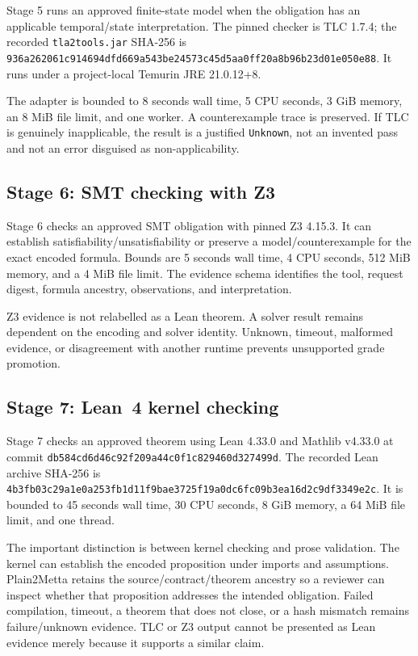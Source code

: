 \documentclass[11pt]{article}
\newcommand{\code}[1]{\texttt{#1}}
\begin{document}
Stage 5 runs an approved finite-state model when the obligation has an
applicable temporal/state interpretation.  The pinned checker is TLC 1.7.4;
the recorded \code{tla2tools.jar} SHA-256 is
\code{936a262061c914694dfd669a543be24573c45d5aa0ff20a8b96b23d01e050e88}.
It runs under a project-local Temurin JRE 21.0.12+8.

The adapter is bounded to 8 seconds wall time, 5 CPU seconds, 3 GiB memory,
an 8 MiB file limit, and one worker.  A counterexample trace is preserved.  If
TLC is genuinely inapplicable, the result is a justified \code{Unknown}, not
an invented pass and not an error disguised as non-applicability.

\subsection{Stage 6: SMT checking with Z3}

Stage 6 checks an approved SMT obligation with pinned Z3 4.15.3.  It can
establish satisfiability/unsatisfiability or preserve a model/counterexample
for the exact encoded formula.  Bounds are 5 seconds wall time, 4 CPU seconds,
512 MiB memory, and a 4 MiB file limit.  The evidence schema identifies the
tool, request digest, formula ancestry, observations, and interpretation.

Z3 evidence is not relabelled as a Lean theorem.  A solver result remains
dependent on the encoding and solver identity.  Unknown, timeout, malformed
evidence, or disagreement with another runtime prevents unsupported grade
promotion.

\subsection{Stage 7: Lean~4 kernel checking}

Stage 7 checks an approved theorem using Lean 4.33.0 and Mathlib v4.33.0 at
commit \code{db584cd6d46c92f209a44c0f1c829460d327499d}.  The recorded Lean
archive SHA-256 is
\code{4b3fb03c29a1e0a253fb1d11f9bae3725f19a0dc6fc09b3ea16d2c9df3349e2c}.
It is bounded to 45 seconds wall time, 30 CPU seconds, 8 GiB memory, a 64 MiB
file limit, and one thread.

The important distinction is between kernel checking and prose validation.
The kernel can establish the encoded proposition under imports and
assumptions.  Plain2Metta retains the source/contract/theorem ancestry so a
reviewer can inspect whether that proposition addresses the intended
obligation.  Failed compilation, timeout, a theorem that does not close, or a
hash mismatch remains failure/unknown evidence.  TLC or Z3 output cannot be
presented as Lean evidence merely because it supports a similar claim.
\end{document}
